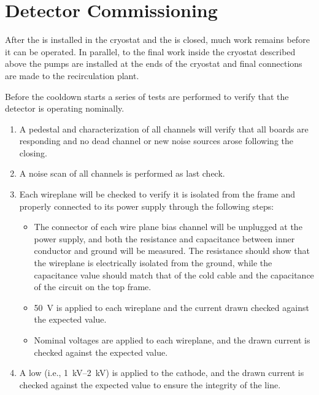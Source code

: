 \section{Detector Commissioning}
\label{sec:fdsp-tc-commiss}


After the  is installed in the cryostat and the  is closed, much work remains before it can be operated. In parallel, to the final work inside the cryostat described above the \lar pumps are installed at the ends of the cryostat and final connections are made to the recirculation plant. 

Before the cooldown starts a series of tests are performed to verify that the detector is operating nominally. 

\begin{enumerate}

    \item A pedestal and  characterization of all  channels will verify that all   boards are responding and no dead channel or new noise sources arose following the  closing.
    
    \item A noise scan of all  channels is performed as last check. %

    \item Each  wireplane will be checked to verify it is isolated from the  frame and properly connected to its  power supply through the following steps:
    
\begin{itemize}

    \item The  connector of each wire plane bias channel will be unplugged at the power supply, and both the resistance and capacitance between inner conductor and ground will be measured. 
    The resistance should show that the wireplane is electrically isolated from the ground, while the capacitance value should match that of the cold  cable and the capacitance of the circuit on the  top frame.

    \item \SI{50}{V} is applied to each wireplane and the current drawn checked against the expected value.
    
    \item Nominal voltages are applied to each wireplane, and the  drawn current is checked against the expected value. 
    
\end{itemize}

    \item A low  (i.e., \SIrange{1}{2}{kV}) is applied to the cathode, and the drawn current is checked against the expected value to ensure the integrity of the  line.

\end{enumerate}

